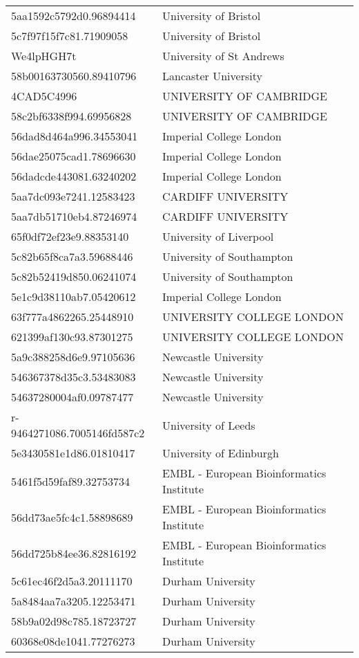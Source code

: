 \begin{tabular}{ll}
5aa1592c5792d0.96894414 & University of Bristol \\
5c7f97f15f7c81.71909058 & University of Bristol \\
We4lpHGH7t & University of St Andrews \\
58b00163730560.89410796 & Lancaster University \\
4CAD5C4996 & UNIVERSITY OF CAMBRIDGE \\
58c2bf6338f994.69956828 & UNIVERSITY OF CAMBRIDGE \\
56dad8d464a996.34553041 & Imperial College London \\
56dae25075cad1.78696630 & Imperial College London \\
56dadcde443081.63240202 & Imperial College London \\
5aa7dc093e7241.12583423 & CARDIFF UNIVERSITY \\
5aa7db51710eb4.87246974 & CARDIFF UNIVERSITY \\
65f0df72ef23e9.88353140 & University of Liverpool \\
5c82b65f8ca7a3.59688446 & University of Southampton \\
5c82b52419d850.06241074 & University of Southampton \\
5e1c9d38110ab7.05420612 & Imperial College London \\
63f777a4862265.25448910 & UNIVERSITY COLLEGE LONDON \\
621399af130c93.87301275 & UNIVERSITY COLLEGE LONDON \\
5a9c388258d6e9.97105636 & Newcastle University \\
546367378d35c3.53483083 & Newcastle University \\
54637280004af0.09787477 & Newcastle University \\
r-9464271086.7005146fd587c2 & University of Leeds \\
5e3430581e1d86.01810417 & University of Edinburgh \\
5461f5d59faf89.32753734 & EMBL - European Bioinformatics Institute \\
56dd73ae5fc4c1.58898689 & EMBL - European Bioinformatics Institute \\
56dd725b84ee36.82816192 & EMBL - European Bioinformatics Institute \\
5c61ec46f2d5a3.20111170 & Durham University \\
5a8484aa7a3205.12253471 & Durham University \\
58b9a02d98c785.18723727 & Durham University \\
60368e08de1041.77276273 & Durham University \\

\end{tabular}
